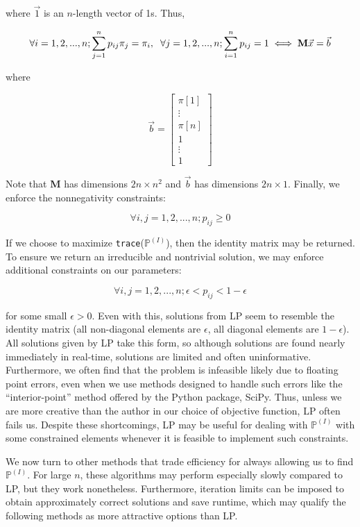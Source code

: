 \documentclass{article}
\begin{document}
where $\vec{1}$ is an $n$-length vector of 1s. Thus,

\[
\forall i=1,2,...,n ; \sum_{j=1}^n p_{ij}\pi_j = \pi_i,
\hspace{2mm}
\forall j=1,2,...,n ; \sum_{i=1}^n p_{ij} = 1 \iff \textbf{M}\vec{x} = \vec{b}
\]

where

\[
\vec{b} = \begin{bmatrix}
    \pi[1] \\
    \vdots \\
    \pi[n] \\
    1 \\
    \vdots \\
    1
\end{bmatrix}
\]

Note that \textbf{M} has dimensions $2n \times n^2$ and $\vec{b}$ has dimensions $2n \times 1$. Finally, we enforce the nonnegativity constraints:

\[
\forall i,j=1,2,...,n ; p_{ij} \geq 0
\]

If we choose to maximize \texttt{trace}($\mathbb{P}^{(I)}$), then the identity matrix may be returned. To ensure we return an irreducible and nontrivial solution, we may enforce additional constraints on our parameters:

\[
\forall i,j=1,2,...,n ; \epsilon < p_{ij} < 1-\epsilon
\]

for some small $\epsilon > 0$. Even with this, solutions from LP seem to resemble the identity matrix (all non-diagonal elements are $\epsilon$, all diagonal elements are $1-\epsilon$). All solutions given by LP take this form, so although solutions are found nearly immediately in real-time, solutions are limited and often uninformative. Furthermore, we often find that the problem is infeasible likely due to floating point errors, even when we use methods designed to handle such errors like the ``interior-point'' method offered by the Python package, SciPy. Thus, unless we are more creative than the author in our choice of objective function, LP often fails us. Despite these shortcomings, LP may be useful for dealing with $\mathbb{P}^{(I)}$ with some constrained elements whenever it is feasible to implement such constraints.

We now turn to other methods that trade efficiency for always allowing us to find $\mathbb{P}^{(I)}$. For large $n$, these algorithms may perform especially slowly compared to LP, but they work nonetheless. Furthermore, iteration limits can be imposed to obtain approximately correct solutions and save runtime, which may qualify the following methods as more attractive options than LP.
\end{document}
